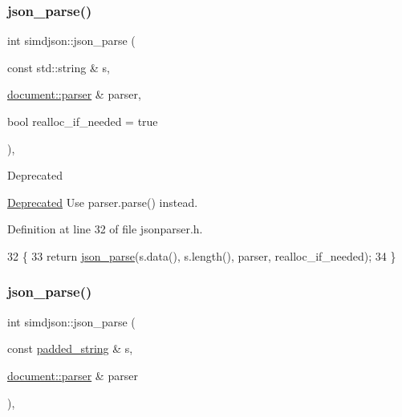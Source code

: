 \subsubsection{\texorpdfstring{json\+\_\+parse()}{json\_parse()}\hspace{0.1cm}{\footnotesize\ttfamily [3/4]}}
{\footnotesize\ttfamily int simdjson\+::json\+\_\+parse (\begin{DoxyParamCaption}\item[{const std\+::string \&}]{s,  }\item[{\hyperlink{classsimdjson_1_1document_1_1parser}{document\+::parser} \&}]{parser,  }\item[{bool}]{realloc\+\_\+if\+\_\+needed = {\ttfamily true} }\end{DoxyParamCaption})\hspace{0.3cm}{\ttfamily [inline]}, {\ttfamily [noexcept]}}

\begin{DoxyRefDesc}{Deprecated}
\item[\hyperlink{deprecated__deprecated000014}{Deprecated}]Use {\ttfamily parser.\+parse()} instead.\end{DoxyRefDesc}


Definition at line 32 of file jsonparser.\+h.


\begin{DoxyCode}
32                                                                                                           \{
33   \textcolor{keywordflow}{return} \hyperlink{namespacesimdjson_abda111a8c160cd422c8e5e6d2542f1eb}{json\_parse}(s.data(), s.length(), parser, realloc\_if\_needed);
34 \}
\end{DoxyCode}
\mbox{\label{namespacesimdjson_aae2715d0a12bd296b6e743c0cb346e15}} 
\subsubsection{\texorpdfstring{json\+\_\+parse()}{json\_parse()}\hspace{0.1cm}{\footnotesize\ttfamily [4/4]}}
{\footnotesize\ttfamily int simdjson\+::json\+\_\+parse (\begin{DoxyParamCaption}\item[{const \hyperlink{structsimdjson_1_1padded__string}{padded\+\_\+string} \&}]{s,  }\item[{\hyperlink{classsimdjson_1_1document_1_1parser}{document\+::parser} \&}]{parser }\end{DoxyParamCaption})\hspace{0.3cm}{\ttfamily [inline]}, {\ttfamily [noexcept]}}


